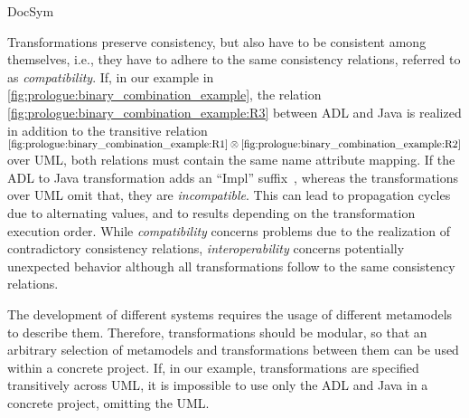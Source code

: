 \begin{copiedFrom}{DocSym}
\begin{description}[leftmargin=\parindent]
\item[Compatibility]
Transformations preserve consistency, but also have to be consistent among themselves, i.e., they have to adhere to the same consistency relations, referred to as \emph{compatibility}.
If, in our example in \autoref{fig:prologue:binary_combination_example}, the relation \ref{fig:prologue:binary_combination_example:R3} between \ac{ADL} and Java is realized in addition to the transitive relation $\mbox{\ref{fig:prologue:binary_combination_example:R1}} \otimes \mbox{\ref{fig:prologue:binary_combination_example:R2}}$ over \ac{UML}, both relations must contain the same name attribute mapping.
If the \ac{ADL} to Java transformation adds an \enquote{Impl} suffix~\cite{langhammer2017a}, whereas the transformations over \ac{UML} omit that, they are \emph{incompatible}.
This can lead to propagation cycles due to alternating values, and to results depending on the transformation execution order. %
While \emph{compatibility} concerns problems due to the realization of contradictory consistency relations, %
\emph{interoperability} concerns potentially unexpected behavior although all transformations follow to the same consistency relations.


\item[Modularity]
The development of different systems requires the usage of different metamodels to describe them.
Therefore, transformations should be modular, so that an arbitrary selection of metamodels and transformations between them can be used within a concrete project.
If, in our example, transformations are specified transitively across \ac{UML}, it is impossible to use only the \ac{ADL} and Java in a concrete project, omitting the \ac{UML}. 


\end{description}
\end{copiedFrom}
